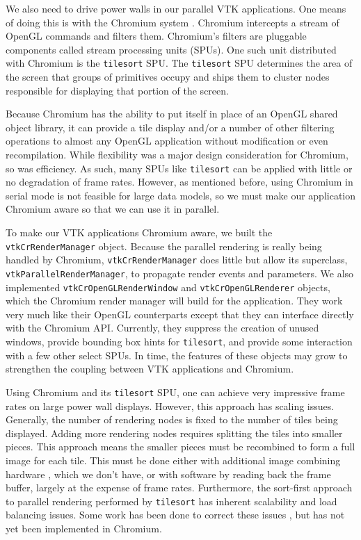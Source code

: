 \documentclass{acmsiggraph}
\newcommand{\cidentifier}[1]{\texttt{#1}}
\begin{document}
  We also need to drive power walls in our parallel VTK applications.  One
  means of doing this is with the Chromium system \cite{Humphreys02}.
  Chromium intercepts a stream of OpenGL commands and filters them.
  Chromium's filters are pluggable components called stream processing
  units (SPUs).  One such unit distributed with Chromium is the
  \cidentifier{tile\-sort} SPU.  The \cidentifier{tile\-sort} SPU
  determines the area of the screen that groups of primitives occupy and
  ships them to cluster nodes responsible for displaying that portion of
  the screen.

  Because Chromium has the ability to put itself in place of an OpenGL
  shared object library, it can provide a tile display and/or a number of
  other filtering operations to almost any OpenGL application without
  modification or even recompilation.  While flexibility was a major design
  consideration for Chromium, so was efficiency.  As such, many SPUs like
  \cidentifier{tile\-sort} can be applied with little or no degradation of
  frame rates.  However, as mentioned before, using Chromium in serial mode
  is not feasible for large data models, so we must make our application
  Chromium aware so that we can use it in parallel.

  To make our VTK applications Chromium aware, we built the
  \cidentifier{vtk\-Cr\-Render\-Manager} object.  Because the parallel
  rendering is really being handled by Chromium,
  \cidentifier{vtk\-Cr\-Render\-Manager} does little but allow its
  superclass, \cidentifier{vtk\-Parallel\-Render\-Manager}, to propagate
  render events and parameters.  We also implemented
  \cidentifier{vtk\-Cr\-Open\-GL\-Render\-Window} and
  \cidentifier{vtk\-Cr\-Open\-GL\-Renderer} objects, which the Chromium
  render manager will build for the application.  They work very much like
  their OpenGL counterparts except that they can interface directly with
  the Chromium API.  Currently, they suppress the creation of unused
  windows, provide bounding box hints for \cidentifier{tile\-sort}, and
  provide some interaction with a few other select SPUs.  In time, the
  features of these objects may grow to strengthen the coupling between VTK
  applications and Chromium.

  Using Chromium and its \cidentifier{tile\-sort} SPU, one can achieve very
  impressive frame rates on large power wall displays.  However, this
  approach has scaling issues.  Generally, the number of rendering nodes is
  fixed to the number of tiles being displayed.  Adding more rendering
  nodes requires splitting the tiles into smaller pieces.  This approach
  means the smaller pieces must be recombined to form a full image for each
  tile.  This must be done either with additional image combining hardware
  \cite{Stoll01}, which we don't have, or with software by reading back the
  frame buffer, largely at the expense of frame rates.  Furthermore, the
  sort-first approach to parallel rendering performed by
  \cidentifier{tile\-sort} has inherent scalability and load balancing
  issues.  Some work has been done to correct these issues
  \cite{Samanta99}, but has not yet been implemented in Chromium.
\end{document}
